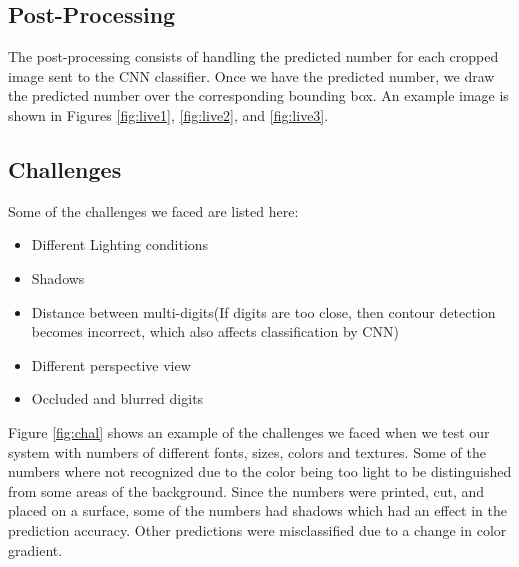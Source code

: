 \documentclass[12pt, letterpaper]{article}
\begin{document}
\subsection{Post-Processing}

The post-processing consists of handling the predicted number for each cropped image sent to the CNN classifier. Once we have the predicted number, we draw the predicted number over the corresponding bounding box. An example image is shown in Figures \ref{fig:live1}, \ref{fig:live2}, and \ref{fig:live3}.

\newpage
\subsection{Challenges}
	Some of the challenges we faced are listed here:
	\begin{itemize}
		\item Different Lighting conditions
		\item Shadows
		\item Distance between multi-digits(If digits are too close, then contour detection becomes incorrect, which also affects classification by CNN)
		\item Different perspective view
		\item Occluded and blurred digits
	\end{itemize}
	
	Figure \ref{fig:chal} shows an example of the challenges we faced when we test our system with numbers of different fonts, sizes, colors and textures. Some of the numbers where not recognized due to the color being too light to be distinguished from some areas of the background. Since the numbers were printed, cut, and placed on a surface, some of the numbers had shadows which had an effect in the prediction accuracy. Other predictions were misclassified due to a change in color gradient.
	
\end{document}
